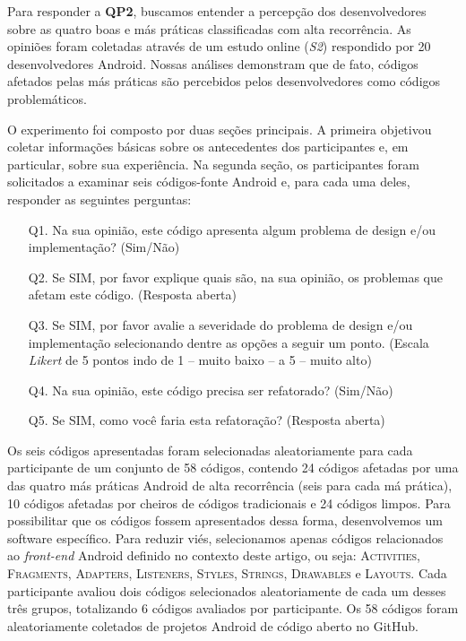 Para responder a \textbf{QP2}, buscamos entender a percepção dos desenvolvedores sobre as quatro boas e más práticas classificadas com alta recorrência. As opiniões foram coletadas através de um estudo online (\textit{S2}) respondido por 20 desenvolvedores Android. Nossas análises demonstram que de fato, códigos afetados pelas más práticas são percebidos pelos desenvolvedores como códigos problemáticos.



O experimento foi composto por duas seções principais. A primeira objetivou coletar informações básicas sobre os antecedentes dos participantes e, em particular, sobre sua experiência. Na segunda seção, os participantes foram solicitados a examinar seis códigos-fonte Android e, para cada uma deles, responder as seguintes perguntas:

\begin{itemize}
	\item[Q1.] Na sua opinião, este código apresenta algum problema de design e/ou implementação? (Sim/Não) 

	\item[Q2.] Se SIM, por favor explique quais são, na sua opinião, os problemas que afetam este código. (Resposta aberta)

	\item[Q3.] Se SIM, por favor avalie a severidade do problema de design e/ou implementação selecionando dentre as opções a seguir um ponto. (Escala \textit{Likert} de 5 pontos indo de 1 -- muito baixo -- a 5 -- muito alto)

	\item[Q4.] Na sua opinião, este código precisa ser refatorado? (Sim/Não)

	\item[Q5.] Se SIM, como você faria esta refatoração? (Resposta aberta)
\end{itemize}

Os seis códigos apresentadas foram selecionadas aleatoriamente para cada participante de um conjunto de 58 códigos, contendo 24 códigos afetadas por uma das quatro más práticas Android de alta recorrência (seis para cada má prática), 10 códigos afetadas por cheiros de códigos tradicionais e 24 códigos limpos. Para possibilitar que os códigos fossem apresentados dessa forma, desenvolvemos um software específico. Para reduzir viés, selecionamos apenas códigos relacionados ao \textit{front-end} Android definido no contexto deste artigo, ou seja: \textsc{Activities}, \textsc{Fragments}, \textsc{Adapters}, \textsc{Listeners}, \textsc{Styles}, \textsc{Strings}, \textsc{Drawables} e \textsc{Layouts}. Cada participante avaliou dois códigos selecionados aleatoriamente de cada um desses três grupos, totalizando 6 códigos avaliados por participante. Os 58 códigos foram aleatoriamente coletados de projetos Android de código aberto no GitHub.

